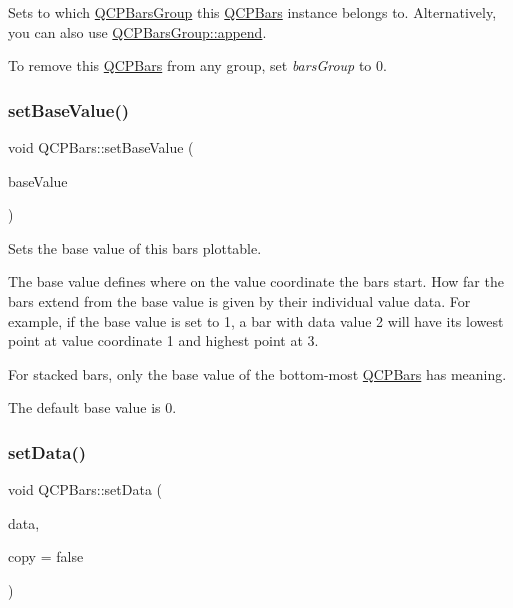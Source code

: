 Sets to which \hyperlink{class_q_c_p_bars_group}{Q\+C\+P\+Bars\+Group} this \hyperlink{class_q_c_p_bars}{Q\+C\+P\+Bars} instance belongs to. Alternatively, you can also use \hyperlink{class_q_c_p_bars_group_a809ed63cc4ff7cd5b0b8c96b470163d3}{Q\+C\+P\+Bars\+Group\+::append}.

To remove this \hyperlink{class_q_c_p_bars}{Q\+C\+P\+Bars} from any group, set {\itshape bars\+Group} to 0. \hypertarget{class_q_c_p_bars_a574ec7eb7537566df1a28ff085d75623}{}\label{class_q_c_p_bars_a574ec7eb7537566df1a28ff085d75623} 
\subsubsection{\texorpdfstring{set\+Base\+Value()}{setBaseValue()}}
{\footnotesize\ttfamily void Q\+C\+P\+Bars\+::set\+Base\+Value (\begin{DoxyParamCaption}\item[{double}]{base\+Value }\end{DoxyParamCaption})}

Sets the base value of this bars plottable.

The base value defines where on the value coordinate the bars start. How far the bars extend from the base value is given by their individual value data. For example, if the base value is set to 1, a bar with data value 2 will have its lowest point at value coordinate 1 and highest point at 3.

For stacked bars, only the base value of the bottom-\/most \hyperlink{class_q_c_p_bars}{Q\+C\+P\+Bars} has meaning.

The default base value is 0. \hypertarget{class_q_c_p_bars_aa3435aab19e0a49e4e7b41bd36a8d96b}{}\label{class_q_c_p_bars_aa3435aab19e0a49e4e7b41bd36a8d96b} 
\subsubsection{\texorpdfstring{set\+Data()}{setData()}\hspace{0.1cm}{\footnotesize\ttfamily [1/2]}}
{\footnotesize\ttfamily void Q\+C\+P\+Bars\+::set\+Data (\begin{DoxyParamCaption}\item[{\hyperlink{qcustomplot_8h_aa846c77472cae93def9f1609d0c57191}{Q\+C\+P\+Bar\+Data\+Map} $\ast$}]{data,  }\item[{bool}]{copy = {\ttfamily false} }\end{DoxyParamCaption})}

